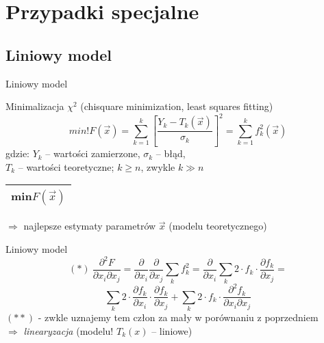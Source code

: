 \section{Przypadki specjalne}

\subsection{Liniowy model}
  \begin{frame}{Liniowy model}
    \begin{block}{Minimalizacja $\chi^{2}$ (chisquare minimization, least squares fitting)}
      \begin{displaymath}
        min!F(\vec{x}) = \sum_{k=1}^{k} \left[ \frac{Y_{k} - T_{k}(\vec{x})}{\sigma_{k}} \right]^{2} = \sum_{k=1}^{k} f_{k}^{2}(\vec{x})
      \end{displaymath}
      gdzie: $Y_{k}$ -- wartości zamierzone, $\sigma_{k}$ -- błąd,\\
      $T_{k}$ -- wartości teoretyczne; $k \geq n$, zwykle $k \gg n$ \\
      \begin{tabular}{|c|} \hline
        min$F(\vec{x})$ \\ \hline
      \end{tabular}
      $\Rightarrow$ najlepsze estymaty parametrów $\vec{x}$
      (modelu teoretycznego)
    \end{block}

  \end{frame}

  \begin{frame}{Liniowy model}
    \begin{equation}
      (*)\ \frac{\partial^2 F}{\partial x_{i} \partial x_{j}} =
      \frac{\partial}{\partial x_{i}} \frac{\partial}{\partial x_{j}}
      \sum_{k} f_{k}^2 = \frac{\partial}{\partial x_{i}}
      \sum_{k} 2 \cdot f_{k} \cdot \frac{\partial f_{k}}{\partial x_{j}} =
      \nonumber
    \end{equation}
    \begin{equation}
      \sum_{k} 2 \cdot \frac{\partial f_{k}}{\partial x_{i}} \cdot
      \frac{\partial f_{k}}{\partial x_{j}} +
      \sum_{k} 2 \cdot f_{k} \cdot
      \frac{\partial^2 f_{k}}{\partial x_{i} \partial x_{j}}
      \nonumber
    \end{equation}
    $(**)$ - zwkle uznajemy tem człon za mały w porównaniu
    z poprzedniem\\
    $\Rightarrow$ \emph{linearyzacja} (modelu! $T_{k}(x)$ -- liniowe)
  \end{frame}

